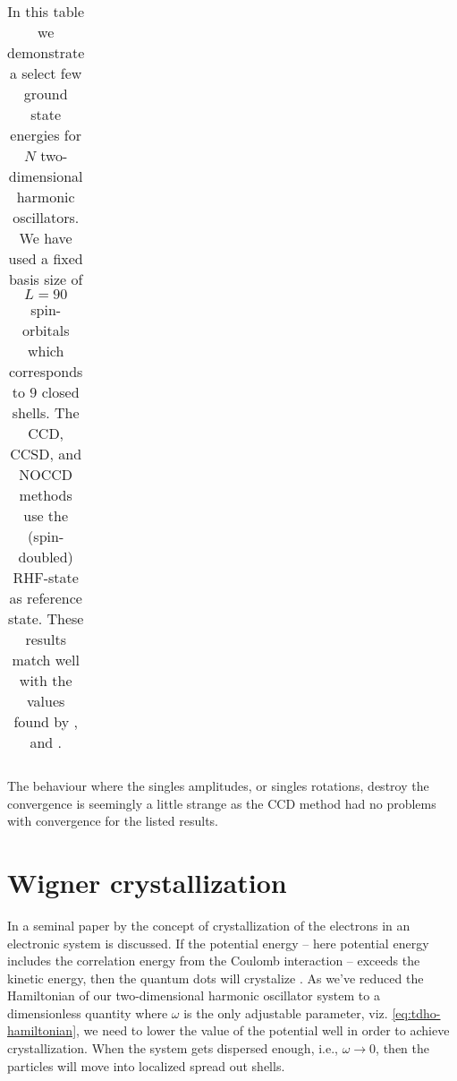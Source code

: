         \begin{table}
            \centering
            \caption{In this table we demonstrate a select few ground state
            energies for $N$ two-dimensional harmonic oscillators.
            We have used a fixed basis size of $L = 90$ spin-orbitals which
            corresponds to $9$ closed shells.
            The CCD, CCSD, and NOCCD methods use the (spin-doubled) RHF-state as
            reference state.
            These results match well with the values found by \citeauthor{fei}
            \cite{fei}, and \citeauthor{lohne} \cite{lohne}.}
            \renewcommand{\arraystretch}{1.3}
            \begin{tabular}{@{}llllll@{}}
                \toprule
                
            \end{tabular}
            \label{tab:gs-tdho}
        \end{table}

        The behaviour where the singles amplitudes, or singles rotations,
        destroy the convergence is seemingly a little strange as the CCD method
        had no problems with convergence for the listed results.

    \section{Wigner crystallization}
        In a seminal paper by \citeauthor{wigner-crystal}
        \cite{wigner-crystal} the concept of crystallization of the electrons in
        an electronic system is discussed.
        If the potential energy -- here potential energy includes the
        correlation energy from the Coulomb interaction -- exceeds the kinetic
        energy, then the quantum dots will crystalize
        \cite{Cavaliere_2009, zeng-wigner, constantine-wigner, Mikhailov2002,
        akman1999277, hogberget2013quantum}.
        As we've reduced the Hamiltonian of our two-dimensional harmonic
        oscillator system to a dimensionless quantity where $\omega$ is the only
        adjustable parameter, viz. \autoref{eq:tdho-hamiltonian}, we need to
        lower the value of the potential well in order to achieve
        crystallization.
        When the system gets dispersed enough, i.e., $\omega \to 0$, then the
        particles will move into localized spread out shells.

